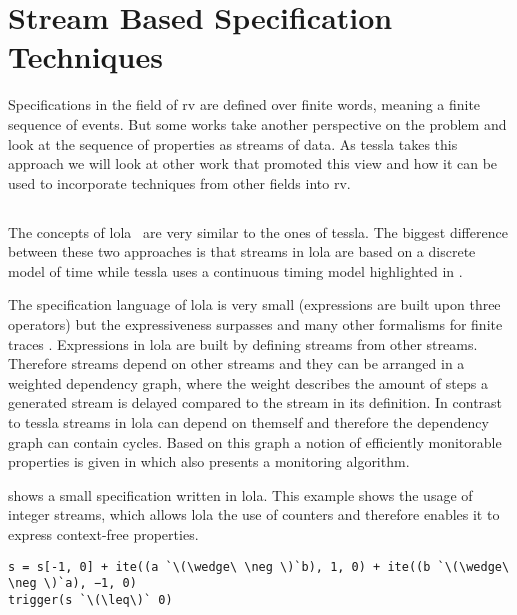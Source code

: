\section{Stream Based Specification Techniques}
\label{sec:related:stream_based}

Specifications in the field of \gls{rv} are defined over finite words, meaning a finite sequence of events.
But some works take another perspective on the problem and look at the sequence of properties as streams of data.
As \gls{tessla} takes this approach we will look at other work that promoted this view and how it can be used to incorporate techniques from other fields into \gls{rv}.

\subsection{}
\label{sec:related:stream_based:lola}

The concepts of \gls{lola}~\cite{DAngelo2005} are very similar to the ones of \gls{tessla}.
The biggest difference between these two approaches is that streams in \gls{lola} are based on a discrete model of time while \gls{tessla} uses a continuous timing model highlighted in .

The specification language of \gls{lola} is very small (expressions are built upon three operators) but the expressiveness surpasses  and many other formalisms for finite traces \citep{DAngelo2005}.
Expressions in \gls{lola} are built by defining streams from other streams.
Therefore streams depend on other streams and they can be arranged in a weighted dependency graph, where the weight describes the amount of steps a generated stream is delayed compared to the stream in its definition.
In contrast to \gls{tessla} streams in \gls{lola} can depend on themself and therefore the dependency graph can contain cycles.
Based on this graph a notion of efficiently monitorable properties is given in \citep{DAngelo2005} which also presents a monitoring algorithm.

 shows a small specification written in \gls{lola}.
This example shows the usage of integer streams, which allows \gls{lola} the use of counters and therefore enables it to express context-free properties.

\begin{lstlisting}[escapeinside=``,numbers=none,float,label=listing:lola_spec, caption={[A specification written in \gls{lola}]A \gls{lola} specification describing the property that the number of \emph{a}\'s in a stream shall never be less then the number of \emph{b}\'s}]
s = s[-1, 0] + ite((a `\(\wedge\ \neg \)`b), 1, 0) + ite((b `\(\wedge\ \neg \)`a), −1, 0)
trigger(s `\(\leq\)` 0)
\end{lstlisting}

